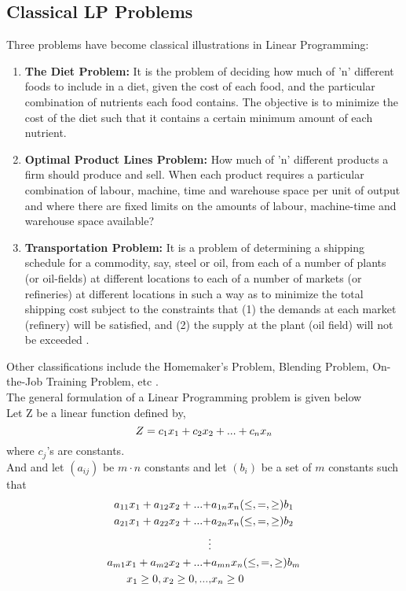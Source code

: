 \documentclass[a4paper,openany]{book}
\begin{document}
			\subsection{Classical LP Problems}
				Three problems have become classical illustrations in Linear Programming:
				\begin{enumerate}
					\item \textbf{The Diet Problem:} It is the problem of deciding how much of 'n' different foods to include in a diet, given the cost of each food, and the particular combination of nutrients each food contains. The objective is to minimize the cost of the diet such that it contains a certain minimum amount of each nutrient.
					\item \textbf{Optimal Product Lines Problem:} How much of 'n' different products a firm should produce and sell. When each product requires a particular combination of labour, machine, time and warehouse space per unit of output and where there are fixed limits on the amounts of labour, machine-time and warehouse space available?
					\item \textbf{Transportation Problem:} It is a problem of determining a shipping schedule for a commodity, say, steel or oil, from each of a number of plants (or oil-fields) at different locations to each of a number of markets (or refineries) at different locations in such a way as to minimize the total shipping cost subject to the constraints that (1) the demands at each market (refinery) will be satisfied, and (2) the supply at the plant (oil field) will not be exceeded \cite{stats}.
				\end{enumerate}
				Other classifications include the Homemaker's Problem, Blending Problem, On-the-Job Training Problem, etc \cite{dantzig,dantzig2}.
			\\
			The general formulation of a Linear Programming problem is given below\\
			Let Z be a linear function defined by,
			\begin{equation}
				Z = c_1x_1 + c_2x_2+...+c_nx_n \notag
			\end{equation}
			where $c_j$'s are constants. \\And and let $(a_{ij})$ be $m \cdot n$ constants and let $(b_i)$ be a set of $m$ constants such that
			\begin{align}
				a_{11}x_1+a_{12}x_2+...+&a_{1n}x_n ( \leq,=,\geq ) b_1\notag  \\ 
				a_{21}x_1+a_{22}x_2+...+&a_{2n}x_n ( \leq,=,\geq ) b_2 \notag \\
				\vdots& \notag \\
				a_{m1}x_1+a_{m2}x_2+...+&a_{mn}x_n ( \leq,=,\geq ) b_m \notag \\
				x_1\geq0,x_2\geq0,...,&x_n\geq0 \notag	
			\end{align}
\end{document}
